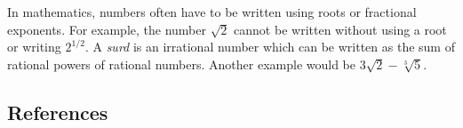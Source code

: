 \documentclass[12pt]{article}
\begin{document}
In mathematics, numbers often have to be written using roots or fractional exponents. For example, the number $\sqrt{2}$ cannot be written without using a root or writing $2^{1/2}$. A \emph{surd} is an irrational number which can be written as the sum of rational powers of rational numbers.
Another example would be $3\sqrt{2}-\sqrt[3]{5}$.
\subsection*{References}
\end{document}
